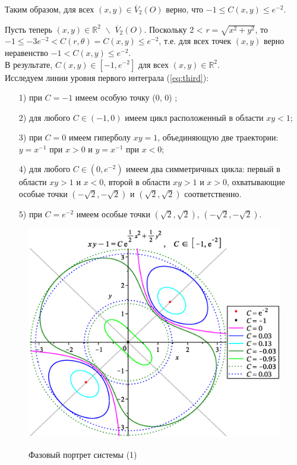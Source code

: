 Таким образом, для всех $(x,y) \in \overline{V}_2(O) $ верно, что $-1 \leq C(x,y)\leq e^{-2}$.

Пусть теперь $(x, y) \in \mathbb{R}^2\,\, \backslash\,\, \overline{V}_2(O)$. Поскольку 2 < $r = \sqrt{x^2 + y^2}$, то $-1 \leq -3e^{-2} < C(r,\theta) = C(x,y) \leq e^{-2}$, т.е. для всех точек $(x,y)$ верно неравенство $-1 < C(x,y)\leq e^{-2}$.\\

В результате, $C(x,y) \in [-1, e^{-2}]$ для всех $(x,y)\in \mathbb{R}^2$.\\

Исследуем линии уровня первого интеграла (\ref{eq:third}):
\begin{enumerate}
\item[{1)}] при $C = -1$ имеем особую точку (0, 0) ;
\item[{2)}] для любого $C \in (-1, 0)$ имеем цикл расположенный в области $xy<1$;
\item[{3)}] при $C = 0$ имеем гиперболу $xy = 1$, объединяющую две траектории: $y = x^{-1}$ при $x > 0$ и $y = x^{-1}$ при $x < 0$;
\item[{4)}] для любого $C \in (0, e^{-2})$ имеем два симметричных цикла: первый в области $xy>1$ и $x< 0$, второй в области $xy>1$ и $x> 0$, охватывающие особые точки $(-\sqrt{2}, -\sqrt{2})$ и $(\sqrt{2}, \sqrt{2})$ соответственно.
\item[{5)}] при $C = e^{-2}$ имеем особые точки $(\sqrt{2}, \sqrt{2})$, $(-\sqrt{2}, -\sqrt{2})$.
\end{enumerate}

\begin{figure}[ht!]%
    \begin{center}
    {\includegraphics[scale=0.65]{zik.eps} }%
    \caption{Фазовый портрет системы (1)}%
    \label{fig:second}
    \end{center}%
\end{figure}

